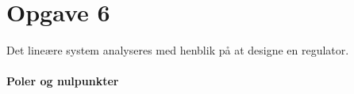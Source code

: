 \section{Opgave 6}
Det lineære system analyseres med henblik på at designe en regulator.
\paragraph{Poler og nulpunkter}
